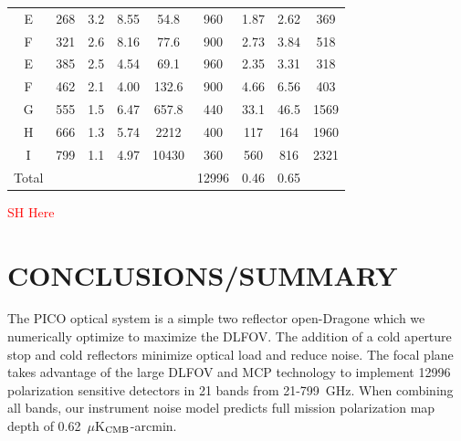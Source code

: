\documentclass[]{spie}  %
\newcommand{\comr}[1]{\textcolor{red}{#1}}
\begin{document}
\begin{table}[ht]
\begin{tabular}{|c|c|c|c|c|c|c|cc|}
E     & 268 & 3.2  & 8.55  & 54.8    & 960   & 1.87   & 2.62 & 369    \\
F     & 321 & 2.6  & 8.16  & 77.6    & 900   & 2.73   & 3.84 & 518    \\
E     & 385 & 2.5  & 4.54  & 69.1    & 960   & 2.35   & 3.31 & 318    \\
F     & 462 & 2.1  & 4.00  & 132.6   & 900   & 4.66   & 6.56 & 403    \\
G     & 555 & 1.5  & 6.47  & 657.8   & 440   & 33.1   & 46.5 & 1569  \\
H     & 666 & 1.3  & 5.74  & 2212    & 400   & 117    & 164  & 1960 \\
I     & 799 & 1.1  & 4.97  & 10430   & 360   & 560    & 816  & 2321 \\ 
\hline
Total &     &      &       &         & 12996 & 0.46   & 0.65 &   \\
\hline
\end{tabular}
\end{table}

\comr{SH Here} 
\section{CONCLUSIONS/SUMMARY}

The PICO optical system is a simple two reflector open-Dragone which we numerically optimize to maximize the DLFOV.  The addition of a 
cold aperture stop and cold reflectors minimize optical load and reduce noise.  The focal plane takes advantage of the large DLFOV and MCP 
technology to implement 12996 polarization sensitive detectors in 21 bands from 21-799~GHz.  When combining all bands, our instrument 
noise model predicts full mission polarization map depth of 0.62~$\mu$K$_{\rm CMB}$-arcmin.




\end{document}
